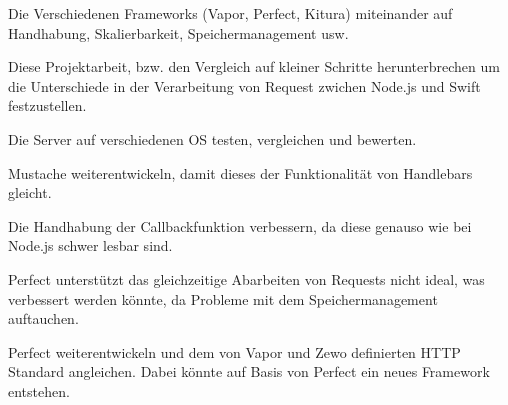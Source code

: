 \begin{compactenum}[a)]
\item Die Verschiedenen Frameworks (Vapor, Perfect, Kitura) miteinander auf Handhabung, Skalierbarkeit, Speichermanagement usw.
\item Diese Projektarbeit, bzw. den Vergleich auf kleiner Schritte herunterbrechen um die Unterschiede in der Verarbeitung von Request zwichen Node.js und Swift festzustellen.
\item Die Server auf verschiedenen OS testen, vergleichen und bewerten.
\item Mustache weiterentwickeln, damit dieses der Funktionalität von Handlebars gleicht.
\item Die Handhabung der Callbackfunktion verbessern, da diese genauso wie bei Node.js schwer lesbar sind.
\item Perfect unterstützt das gleichzeitige Abarbeiten von Requests nicht ideal, was verbessert werden könnte, da Probleme mit dem Speichermanagement auftauchen.
\item Perfect weiterentwickeln und dem von Vapor und Zewo definierten HTTP Standard angleichen. Dabei könnte auf Basis von Perfect ein neues Framework entstehen.
\end{compactenum}
\chapterend
